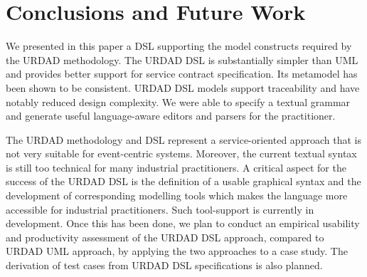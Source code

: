 \section{Conclusions and Future Work}
\label{sec:conclusionsAndOutlook}
We presented in this paper a DSL supporting the model constructs required by the URDAD methodology. The URDAD DSL is substantially simpler than UML and provides better support for service contract specification. Its metamodel has been shown to be consistent. URDAD DSL models support traceability and have notably reduced design complexity. We were able to specify a textual grammar and generate useful language-aware editors and parsers for the practitioner.

The URDAD methodology and DSL represent a service-oriented approach that is not very suitable for event-centric systems. Moreover, the current textual syntax is still too technical for many industrial practitioners. A critical aspect for the success of the URDAD DSL is the definition of a usable graphical syntax and the development of corresponding modelling tools which makes the language more accessible for industrial practitioners. Such tool-support is currently in development. Once this has been done, we plan to conduct an empirical usability and productivity assessment of the URDAD DSL approach, compared to URDAD UML approach, by applying the two approaches to a case study. The derivation of test cases from URDAD DSL specifications is also planned.